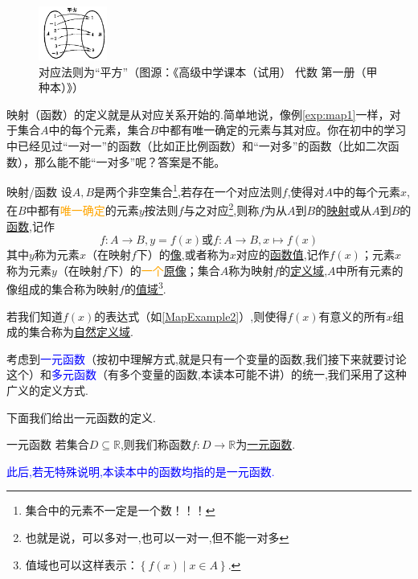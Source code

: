 \documentclass[lang=cn,math=cm,chinesefont=nofont,11pt,scheme=chinese,twocol]{elegantbook}
\begin{document}
\begin{figure}[h]
  \centering
  \includegraphics[width=0.2\textwidth]{image/map2.1.1.png}
  \caption{对应法则为“平方”（图源：《高级中学课本（试用） 代数 第一册（甲种本）》）}
  \label{img:map1}
\end{figure}

映射（函数）的定义就是从对应关系开始的.简单地说，像例\ref{exp:map1}一样，对于集合$A$中的每个元素，集合$B$中都有唯一确定的元素与其对应。你在初中的学习中已经见过“一对一”的函数（比如正比例函数）和“一对多”的函数（比如二次函数），那么能不能“一对多”呢？答案是不能。

\begin{definition}{映射/函数}\label{def:map}
  设$A,B$是两个非空集合\footnote{集合中的元素不一定是一个数！！！},若存在一个对应法则$f$,使得对$A$中的每个元素$x$,在$B$中都有\textcolor{orange}{唯一确定}的元素$y$按法则$f$与之对应\footnote{也就是说，可以多对一,也可以一对一,但不能一对多},则称$f$为从$A$到$B$的\underline{映射}或从$A$到$B$的\underline{函数},记作$$f:A\rightarrow B,y=f(x)\text{或}f:A\rightarrow B,x\mapsto f(x)$$其中$y$称为元素$x$（在映射$f$下）的\underline{像},或者称为$x$对应的\underline{函数值},记作$f(x)$；元素$x$称为元素$y$（在映射$f$下）的\textcolor{orange}{一个}\underline{原像}；集合$A$称为映射$f$的\underline{定义域},$A$中所有元素的像组成的集合称为映射$f$的\underline{值域}\footnote{值域也可以这样表示：$\left\{f(x)\mid x\in A\right\}.$}.

  若我们知道$f(x)$的表达式（如\ref{MapExample2}）,则使得$f(x)$有意义的所有$x$组成的集合称为\underline{自然定义域}.
\end{definition}

考虑到\textcolor{blue}{一元函数}（按初中理解方式,就是只有一个变量的函数,我们接下来就要讨论这个）和\textcolor{blue}{多元函数}（有多个变量的函数,本读本可能不讲）的统一,我们采用了这种广义的定义方式.

下面我们给出一元函数的定义.

\begin{definition}{一元函数}
  若集合$D\subseteq \mathbb{R}$,则我们称函数$f:D\rightarrow\mathbb{R}$为\underline{一元函数}.
\end{definition}

\textcolor{blue}{此后,若无特殊说明,本读本中的函数均指的是一元函数.}
\end{document}
